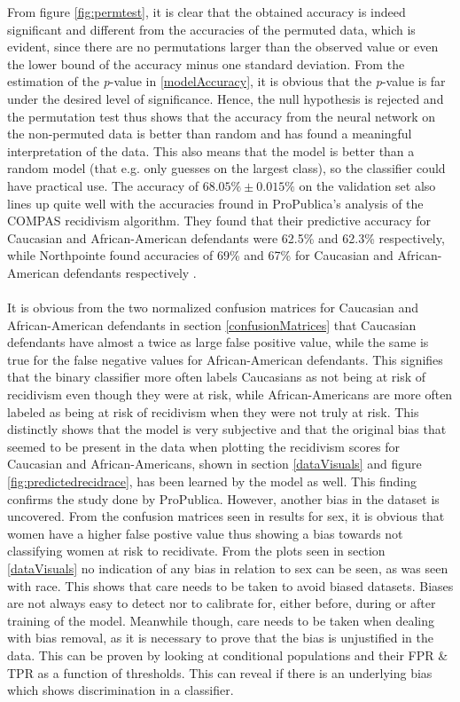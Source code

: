\documentclass[11pt, fleqn, titlepage]{article}
\begin{document}
	From figure \ref{fig:permtest}, it is clear that the obtained accuracy is indeed significant and different from the accuracies of the permuted data, which is evident, since there are no permutations larger than the observed value or even the lower bound of the accuracy minus one standard deviation. From the estimation of the \textit{p}-value in \ref{modelAccuracy}, it is obvious that the \textit{p}-value is far under the desired level of significance. Hence, the null hypothesis is rejected and the permutation test thus shows that the accuracy from the neural network on the non-permuted data is better than random and has found a meaningful interpretation of the data. This also means that the model is better than a random model (that e.g. only guesses on the largest class), so the classifier could have practical use. The accuracy of $68.05\% \pm 0.015\%$ on the validation set also lines up quite well with the accuracies fround in ProPublica's analysis of the COMPAS recidivism algorithm. They found that their predictive accuracy for Caucasian and African-American defendants were 62.5\% and 62.3\% respectively, while Northpointe found accuracies of 69\% and 67\% for Caucasian and African-American defendants respectively \cite{propublicaAnalysis}. \\\\
	\noindent
	It is obvious from the two normalized confusion matrices for Caucasian and African-American defendants in section \ref{confusionMatrices} that Caucasian defendants have almost a twice as large false positive value, while the same is true for the false negative values for African-American defendants. This signifies that the binary classifier more often labels Caucasians as not being at risk of recidivism even though they were at risk, while African-Americans are more often labeled as being at risk of recidivism when they were not truly at risk. This distinctly shows that the model is very subjective and that the original bias that seemed to be present in the data when plotting the recidivism scores for Caucasian and African-Americans, shown in section \ref{dataVisuals} and figure \ref{fig:predictedrecidrace}, has been learned by the model as well. This finding confirms the study done by ProPublica. However, another bias in the dataset is uncovered. From the confusion matrices seen in results for sex, it is obvious that women have a higher false postive value thus showing a bias towards not classifying women at risk to recidivate. From the plots seen in section \ref{dataVisuals} no indication of any bias in relation to sex can be seen, as was seen with race. This shows that care needs to be taken to avoid biased datasets. Biases are not always easy to detect nor to calibrate for, either before, during or after training of the model. Meanwhile though, care needs to be taken when dealing with bias removal, as it is necessary to prove that the bias is unjustified in the data. This can be proven by looking at conditional populations and their FPR \& TPR as a function of thresholds. This can reveal if there is an underlying bias which shows discrimination in a classifier. 
	
\end{document}
